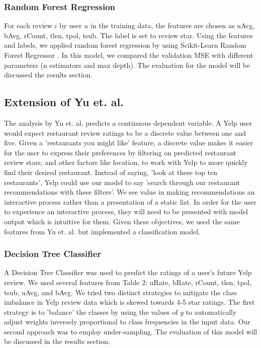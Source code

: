 \documentclass[12pt]{article}
\begin{document}
\subsubsection{Random Forest Regression}

For each review $i$ by user $u$ in the training data, the features are chosen as uAvg, bAvg,
rCount, tlen, tpol, tsub. The label is set to review star. Using the features and labels,
we applied random forest regression by using Scikit-Learn Random Forest Regressor
\cite{32432skl20:online}. In this model, we compared the validation MSE with different
parameters (n estimators and max depth). The evaluation for the model will be discussed the
results section.

\subsection{Extension of Yu et. al.}

The analysis by Yu et. al. \cite{yu2015restaurants} predicts a continuous dependent variable.
A Yelp user would expect restaurant review ratings to be a discrete value between
one and five. Given a 'restaurants you might like' feature, a discrete value makes it easier
for the user to express their preferences by filtering on predicted restaurant review stars,
and other factors like location, to work with Yelp to more quickly find their desired restaurant.
Instead of saying, 'look at these top ten restaurants', Yelp could use our model to say
'search through our restaurant recommendations with these filters'. We see value in making
recommendations an interactive process rather than a presentation of a static list. In order
for the user to experience an interactive process, they will need to be presented with
model output which is intuitive for them. Given these objectives, we used the same features
from Yu et. al. \cite{yu2015restaurants} but implemented a classification model.

\subsubsection{Decision Tree Classifier}

A Decision Tree Classifier \cite{sklearnt25:online} was used to predict the ratings
of a user's future Yelp review. We used several features from Table 2: uRate, bRate, rCount,
tlen, tpol, tsub, uAvg, and bAvg. We tried two distinct strategies to mitigate the class imbalance
in Yelp review data which is skewed towards 4-5 star ratings. The first strategy is to
'balance' the classes by using the values of $y$ to automatically adjust weights inversely
proportional to class frequencies in the input data. Our second approach was to employ
under-sampling. The evaluation of this model will be discussed in the results section.
\end{document}
